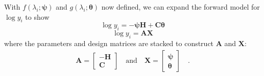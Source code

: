 \documentclass[modern]{aastex631}
\renewcommand{\vec}[1]{\mathbf{#1}}
\newcommand{\vectheta}{\boldsymbol{\theta}}
\newcommand{\vecpsi}{\boldsymbol{\psi}}
\newcommand{\vecH}{\mathbf{H}}
\begin{document}
With $f(\lambda_i;\vecpsi)$ and $g(\lambda_i;\vectheta)$ now defined, we can expand the forward model for $\log{y_i}$ to show
\begin{equation}
    \log{y_i} = -\vecpsi\vecH + \vec{C}\vectheta
\end{equation}
\begin{equation}
    \log{y_i} = \vec{A}\vec{X}
\end{equation}
where the parameters and design matrices are stacked to construct $\vec{A}$ and $\vec{X}$:
\begin{eqnarray}
    \vec{A} = \begin{bmatrix}-\vec{H}\\\vec{C}\end{bmatrix}
    \quad \mbox{and} \quad 
    \vec{X} = \begin{bmatrix}\vecpsi\\\vectheta\end{bmatrix} 
    \quad .
\end{eqnarray}



\end{document}
